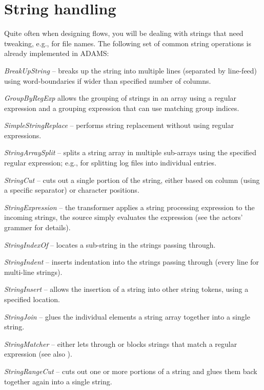 \section{String handling}
\label{string_handling}
Quite often when designing flows, you will be dealing with strings that need
tweaking, e.g., for file names. The following set of common string operations is
already implemented in ADAMS:
\begin{tight_itemize}
	\item \textit{BreakUpString} -- breaks up the string into multiple lines
	(separated by line-feed) using word-boundaries if wider than specified
	number of columns.
	\item \textit{GroupByRegExp} allows the grouping of strings in an array
	using a regular expression and a grouping expression that can use
	matching group indices.
	\item \textit{SimpleStringReplace} -- performs string replacement
	without using regular expressions.
	\item \textit{StringArraySplit} -- splits a string array in multiple
	sub-arrays using the specified regular expression; e.g., for splitting
	log files into individual entries.
	\item \textit{StringCut} -- cuts out a single portion of the string, either
	based on column (using a specific separator) or character positions.
	\item \textit{StringExpression} -- the transformer applies a string processing
	expression to the incoming strings, the source simply evaluates the expression
	(see the actors' grammer for details).
	\item \textit{StringIndexOf} -- locates a sub-string in the strings passing
	through.
	\item \textit{StringIndent} -- inserts indentation into the strings
	passing through (every line for multi-line strings).
	\item \textit{StringInsert} -- allows the insertion of a string into other
	string tokens, using a specified location.
	\item \textit{StringJoin} -- glues the individual elements a string array
	together into a single string.
	\item \textit{StringMatcher} -- either lets through or blocks strings that
	match a regular expression (see also \cite{regexp}).
	\item \textit{StringRangeCut} -- cuts out one or more portions of a string and
	glues them back together again into a single string.

\end{tight_itemize}

